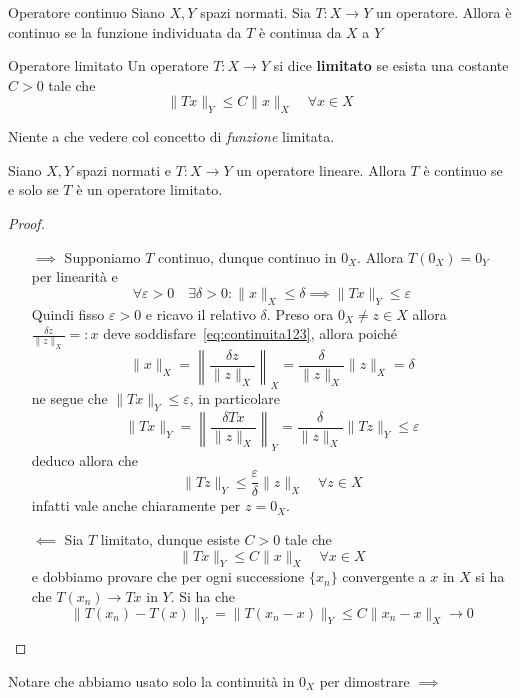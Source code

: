 \begin{definition}{Operatore continuo}
    Siano \(X, Y\) spazi normati. Sia \(T : X \to Y\) un operatore. Allora è
    continuo se la funzione individuata da \(T\) è continua da \(X\) a \(Y\) 
\end{definition}
\begin{definition}{Operatore limitato}
    Un operatore \(T : X \to Y\) si dice \textbf{limitato} se esista una
    costante \(C > 0\) tale che
    \[
      \|Tx\|_Y \le C\|x\|_X \quad \forall x \in X
    \]
\end{definition}
\begin{remark}
    Niente a che vedere col concetto di \emph{funzione} limitata. 
\end{remark}
\begin{theorem}
    Siano \(X, Y\) spazi normati e \(T : X \to Y\) un operatore lineare. Allora
    \(T\) è continuo se e solo se \(T\) è un operatore limitato.
\end{theorem}
\begin{proof}\( \)
\begin{itemize}
    \item[\(\implies \)] Supponiamo \(T\) continuo, dunque continuo in \(0_X\).
        Allora \(T{(0_X)} = 0_Y\) per linearità e
        \begin{equation}\label{eq:continuita123}
          \forall \varepsilon > 0 \quad \exists \delta > 0 : \|x\|_X \le  \delta
          \implies \|Tx\|_Y \le  \varepsilon
        \end{equation}
        Quindi fisso \(\varepsilon>0\) e ricavo il relativo \(\delta\). Preso ora \(0_X \neq z \in X\) allora \(\displaystyle \frac{\delta
        z}{\|z\|_X} =: x\) deve soddisfare~\ref{eq:continuita123}, allora poiché
        \[
            \|x\|_X = \left\| \frac{\delta z}{\|z\|_X} \right\|_X =
            \frac{\delta}{\|z\|_X} \|z\|_X = \delta
        \]
        ne segue che \(\|Tx\|_Y \le \varepsilon\), in particolare
        \[
            \|Tx\|_Y = \left\| \frac{\delta Tx}{\|z\|_X} \right\|_Y =
            \frac{\delta}{\|z\|_X} \|Tz\|_Y \le \varepsilon
        \]
        deduco allora che 
        \[
          \|Tz\|_Y \le \frac{\varepsilon}{\delta} \|z\|_X \quad \forall z \in X
        \]
        infatti vale anche chiaramente per \(z = 0_X\).
    \item[\(\impliedby \)] Sia \(T\) limitato, dunque esiste \(C > 0\) tale che 
        \[
          \| Tx\|_Y \le C \|x\|_X \quad \forall x \in X
        \]
        e dobbiamo provare che per ogni successione \(\{x_{n}\} \) convergente a
        \(x\) in \(X\)  si ha che \(T{(x_{n})} \to Tx\) in \(Y\). Si ha che
        \[
            \|T{(x_{n})} - T{(x)}\|_Y = \|T{(x_{n} - x)}\|_Y \le C \|x_{n} -
            x\|_X \to 0
        \]
\end{itemize}
\end{proof}
\begin{note}
    Notare che abbiamo usato solo la continuità in \(0_X\) per dimostrare \(\implies\) 
\end{note}

